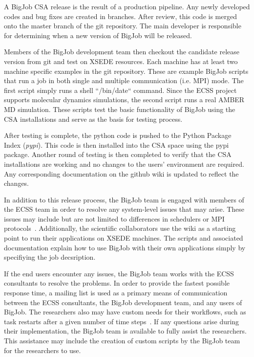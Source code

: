 \documentclass{sig-alternate}
\begin{document}
A BigJob CSA release is the result of a production pipeline. Any newly developed
codes and bug fixes are created in branches. After review, this code is merged
onto the master branch of the git repository. The main developer is responsible
for determining when a new version of BigJob will be released. 

Members of the BigJob development team then checkout the candidate release
version from git and test on XSEDE resources. Each machine has at least two
machine specific examples in the git repository. These are example BigJob
scripts that run a job in both single and multiple communication (i.e. MPI)
mode. The first script simply runs a shell ``/bin/date`` command. Since the ECSS
project supports molecular dynamics simulations, the second script runs a real
AMBER MD simulation. These scripts test the basic functionality of BigJob using
the CSA installations and serve as the basis for testing process.

After testing is complete, the python code is pushed to the Python Package Index
(\textit{pypi}). This code is then installed into the CSA space using the pypi
package. Another round of testing is then completed to verify that the CSA
installations are working and no changes to the users' environment are required.
Any corresponding documentation on the github wiki is updated to reflect the
changes.

In addition to this release process, the BigJob team is engaged with members
of the ECSS team in order to resolve any system-level issues that may arise.
These issues may include but are not limited to differences in schedulers or MPI
protocols~. Additionally, the scientific collaborators use the wiki as a
starting point to run their applications on XSEDE machines. The scripts and
associated documentation explain how to use BigJob with their own applications
simply by specifiying the job decsription.~

If the end users encounter any issues, the BigJob team works with the ECSS
consultants to resolve the problems. In order to provide the fastest possible
response time, a mailing list is used as a primary means of communication
between the ECSS consultants, the BigJob development team, and any users of
BigJob. The researchers also may have custom needs for their workflows, such as
task restarts after a given number of time steps~. If any questions arise during their implementation, the BigJob
team is available to fully assist the researchers. This assistance may include
the creation of custom scripts by the BigJob team for the researchers to use.
\end{document}
